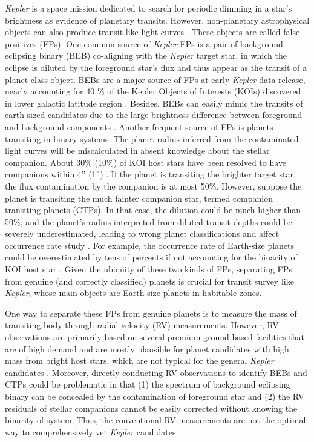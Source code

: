 \documentclass{aastex63}
\begin{document}
 \emph{Kepler} \citep{2010Sci...327..977B} is a space mission dedicated to search for periodic dimming in a star's brightness as evidence of planetary transits. However, non-planetary astrophysical objects can also produce transit-like light curves \citep{Brown2003}. These objects are called false positives (FPs). One common source of \emph{Kepler} FPs is a pair of background eclipsing binary (BEB) co-aligning with the \emph{Kepler} target star, in which the eclipse is diluted by the foreground star's flux and thus appear as the transit of a planet-class object. BEBs are a major source of FPs at early \emph{Kepler} data release, nearly accounting for 40 \% of the Kepler Objects of Interests (KOIs) discovered in lower galactic latitude region \citep{Batalha2010,Batalha2013,Borucki2011,Bryson2010}. Besides, BEBs can easily mimic the transits of earth-sized candidates due to the large brightness difference between foreground and background components \citep{Fressin2013}. Another frequent source of FPs is planets transiting in binary systems. The planet radius inferred from the contaminated light curves will be miscalculated in absent knowledge about the stellar companion. About 30\% (10\%) of KOI host stars have been resolved to have companions within 4'' (1'')  \citep{Law2014,Ziegler2016,Furlan2017,Ziegler2018}. If the planet is transiting the brighter target star, the flux contamination by the companion is at most 50\%. However, suppose the planet is transiting the much fainter companion star, termed companion transiting planets (CTPs). In that case, the dilution could be much higher than 50\%, and the planet's radius interpreted from diluted transit depths could be severely underestimated, leading to wrong planet classifications and affect occurrence rate study \citep{Borucki2011,Ziegler2016,Wang2018,Teske2018}. For example, the occurrence rate of Earth-size planets could be overestimated by tens of percents if not accounting for the binarity of KOI host star \citep{Bouma2018}. Given the ubiquity of these two kinds of FPs, separating FPs from genuine (and correctly classified) planets is crucial for transit survey like \emph{Kepler}, whose main objects are Earth-size planets in habitable zones.

 One way to separate these FPs from genuine planets is to measure the mass of transiting body through radial velocity (RV) measurements. However, RV observations are primarily based on several premium ground-based facilities that are of high demand and are mostly plausible for planet candidates with high mass from bright host stars, which are not typical for the general \emph{Kepler} candidates \citep{Borucki2011,Batalha2010}. Moreover, directly conducting RV observations to identify BEBs and CTPs could be problematic in that (1) the spectrum of background eclipsing binary can be concealed by the contamination of foreground star and (2) the RV residuals of stellar companions cannot be easily corrected without knowing the binarity of system. Thus, the conventional RV measurements are not the optimal way to comprehensively vet \emph{Kepler} candidates.
 
\end{document}
